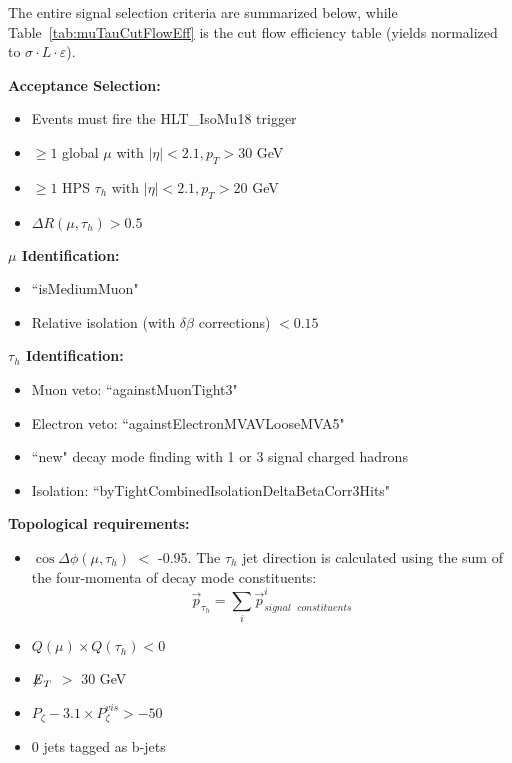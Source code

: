 The entire signal selection criteria are summarized below, while Table~\ref{tab:muTauCutFlowEff} is the cut flow efficiency table (yields normalized to $\sigma 
\cdot L \cdot \varepsilon$).

\textbf{Acceptance Selection:}

\begin{itemize}
  \item Events must fire the HLT{\_}IsoMu18 trigger
  \item $\ge 1$ global $\mu$ with $|\eta| < 2.1, p_{T} > 30$ GeV
  \item $\ge 1$ HPS $\tau_{h}$ with $|\eta| < 2.1, p_{T} > 20$ GeV
  \item $\Delta R(\mu,\tau_{h}) > 0.5$
\end{itemize}

\textbf{$\mu$ Identification:}

\begin{itemize}
  \item ``isMediumMuon"
  \item Relative isolation (with $\delta\beta$ corrections) $< 0.15$
\end{itemize}

\textbf{$\tau_{h}$ Identification:}

\begin{itemize}
  \item Muon veto: ``againstMuonTight3"
  \item Electron veto: ``againstElectronMVAVLooseMVA5"
  \item ``new" decay mode finding with 1 or 3 signal charged hadrons
  \item Isolation: ``byTightCombinedIsolationDeltaBetaCorr3Hits"
\end{itemize}

\newpage
\textbf{Topological requirements:}

\begin{itemize}
  \item $\cos \Delta \phi (\mu,\tau_{h})$ $<$ -0.95. The $\tau_{h}$ jet direction is calculated using the sum of the four-momenta of decay mode constituents:
\begin{equation}
   \overrightarrow{p}_{\tau_{h}} = \sum_{i} \overrightarrow{p}_{signal\mbox{ }constituents}^{i}
   \label{eq:taudirection}
\end{equation}
  \item $Q(\mu) \times Q(\tau_{h}) < 0 $
  \item ${\not\mathrel{E}}_T$ $>$ 30 GeV
  \item $P_{\zeta}- 3.1 \times P_{\zeta}^{vis} > -50$
  \item 0 jets tagged as b-jets
\end{itemize}

